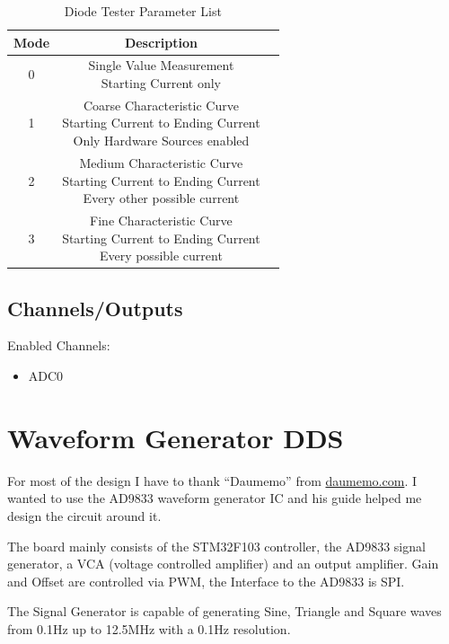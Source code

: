 \begin{table}[H]
    \centering
    \begin{tabular}{|c|c|l|}
        \hline
        \textbf{Mode}   &  \multicolumn{1}{|c|}{\textbf{Description}}\\ \hline \hline
        0   &  \makecell[l]{Single Value Measurement \\ Starting Current only}\\ \hline
		1   &  \makecell[l]{Coarse Characteristic Curve \\ Starting Current to Ending Current \\ Only Hardware Sources enabled}\\ \hline
		2   &  \makecell[l]{Medium Characteristic Curve \\ Starting Current to Ending Current \\ Every other possible current}\\ \hline
		3   &  \makecell[l]{Fine Characteristic Curve \\ Starting Current to Ending Current \\ Every possible current}\\ \hline
    \end{tabular}
	\caption{Diode Tester Parameter List}
\label{tab:Par-Diode}
\end{table}
\subsection{Channels/Outputs}
Enabled Channels:
\begin{itemize}
	\item ADC0
\end{itemize}
\section{Waveform Generator DDS}
For most of the design I have to thank ``Daumemo'' from \textcolor{blue}{\href{https://daumemo.com}{daumemo.com}}. I wanted to use the AD9833 waveform generator IC and his guide helped me design the circuit around it. 

The board mainly consists of the STM32F103 controller, the AD9833 signal generator, a VCA (voltage controlled amplifier) and an output amplifier. Gain and Offset are controlled via PWM, the Interface to the AD9833 is SPI. 

The Signal Generator is capable of generating Sine, Triangle and Square waves from 0.1Hz up to 12.5MHz with a 0.1Hz resolution. 

